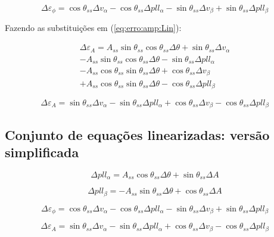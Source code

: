 \documentclass[12pt,a4paper]{report}
\begin{document}
\begin{equation}
\Delta \varepsilon_\phi = 
 \cos \theta_{ss} \Delta v_{\alpha} 
- \cos \theta_{ss}  \Delta pll_\alpha 
- \sin \theta_{ss} \Delta v_\beta 
+ \sin \theta_{ss}  \Delta pll_\beta
\label{eq:erro:phi:Lin:2}
\end{equation}





Fazendo as substituições em (\ref{eq:erro:amp:Lin}):


\begin{multline}
\Delta\varepsilon_A =
A_{ss} \sin \theta_{ss} \cos \theta_{ss} \Delta \theta 
+ \sin \theta_{ss}  \Delta v_\alpha \\
- A_{ss} \sin \theta_{ss} \cos \theta_{ss} \Delta \theta
- \sin \theta_{ss} \Delta pll_\alpha \\
- A_{ss} \cos \theta_{ss} \sin \theta_{ss}  \Delta \theta
+ \cos \theta_{ss} \Delta v_\beta \\
+ A_{ss} \cos \theta_{ss} \sin \theta_{ss}  \Delta \theta
- \cos \theta_{ss} \Delta pll_\beta
\end{multline}


\begin{equation}
\Delta\varepsilon_A =
\sin \theta_{ss}  \Delta v_\alpha 
- \sin \theta_{ss} \Delta pll_\alpha 
+ \cos \theta_{ss} \Delta v_\beta 
- \cos \theta_{ss} \Delta pll_\beta
\label{eq:erro:amp:Lin:2}
\end{equation}










\subsection{Conjunto de equações linearizadas: versão simplificada}

\begin{equation}
\Delta pll_{\alpha} = 
A_{ss} \cos \theta_{ss} \Delta \theta +
\sin \theta_{ss} \Delta A
\end{equation}



\begin{equation}
\Delta pll_{\beta} = 
- A_{ss} \sin \theta_{ss} \Delta \theta +
\cos \theta_{ss} \Delta A
\end{equation}




\begin{equation}
\Delta \varepsilon_\phi = 
\cos \theta_{ss} \Delta v_{\alpha} 
- \cos \theta_{ss}  \Delta pll_\alpha 
- \sin \theta_{ss} \Delta v_\beta 
+ \sin \theta_{ss}  \Delta pll_\beta
\end{equation}


\begin{equation}
\Delta\varepsilon_A =
\sin \theta_{ss}  \Delta v_\alpha 
- \sin \theta_{ss} \Delta pll_\alpha 
+ \cos \theta_{ss} \Delta v_\beta 
- \cos \theta_{ss} \Delta pll_\beta
\end{equation}
\end{document}
